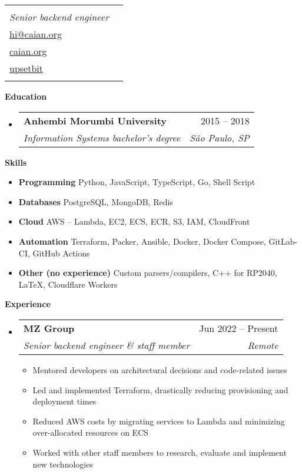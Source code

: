 \documentclass[letterpaper,12pt]{article}[leftmargin=*]
\makeatletter
\def \fullname {Caian Ertl}
\def \subtitle {Senior backend engineer}
\def \emailicon {\faEnvelope}
\def \emaillink {mailto:hi@caian.org}
\def \emailtext {hi@caian.org}
\def \phoneicon {\faPhone}
\def \phonetext {+1 (212) 555-4240}
\def \githubicon {\faGithub}
\def \githublink {https://github.com/upsetbit}
\def \githubtext {upsetbit}
\def \websiteicon {\faGlobe}
\def \websitelink {https://caian.org}
\def \websitetext {caian.org}
\def \headertype {\singlecol} %
\def \entryspacing {-0pt}
\def \phone {\phoneicon \hspace{3pt}{ \phonetext}}
\def \email {\emailicon \hspace{3pt}\href{\emaillink}{\emailtext}}
\def \github {\githubicon \hspace{3pt}\href{\githublink}{\githubtext}}
\def \website {\websiteicon \hspace{3pt}\href{\websitelink}{\websitetext}}
\renewcommand{\section}[2]{\vspace{5pt}
  \colorbox{secondary}{\color{white}\raggedbottom\normalsize\textbf{{#1}{\hspace{7pt}#2}}}
}
\newcommand{\resumeEntryStart}{\begin{itemize}[leftmargin=2.5mm]}
\newcommand{\resumeEntryEnd}{\end{itemize}\vspace{\entryspacing}}
\newcommand{\resumeItemListStart}{\begin{itemize}[leftmargin=4.5mm]}
\newcommand{\resumeItemListEnd}{\end{itemize}}
\newcommand{\resumeItem}[1]{
  \item\small{
    {#1 \vspace{-2pt}}
  }
}
\newcommand{\resumeEntryTSDL}[4]{
  \vspace{-1pt}\item[]
    \begin{tabularx}{0.97\textwidth}{X@{\hspace{60pt}}r}
      \textbf{\color{primary}#1} & {\firabook\color{accent}\small#2} \\
      \textit{\color{accent}\small#3} & \textit{\color{accent}\small#4} \\
    \end{tabularx}\vspace{-6pt}
}
\newcommand{\resumeEntryS}[2]{
  \item[]\small{
    \textbf{\color{primary}#1 }{ #2 \vspace{-6pt}}
  }
}
\newcommand{\doublecol}[5]{
  \begin{tabularx}{\textwidth}{Xr}
    {
      \begin{tabular}[c]{l}
        \fontsize{35}{45}\selectfont{\color{primary}{{\textbf{\fullname}}}} \\
        {\textit{\subtitle}} %
      \end{tabular}
    } & {
      \begin{tabular}[c]{l@{\hspace{1.5em}}l}
        {\small#3} & {\small#1} \\
        {\small#4} & {\small#2} \\
        {\small#5}
      \end{tabular}
    }
  \end{tabularx}
}
\newcommand{\singlecol}[5]{
  \begin{tabularx}{\textwidth}{Xr}
    {
      \begin{tabular}[b]{l}
        \fontsize{35}{45}\selectfont{\color{primary}{{\textbf{\fullname}}}} \\
        {\textit{\subtitle}} %
      \end{tabular}
    } & {
      \begin{tabular}[c]{l}
        {\small#1} \\
        {\small#2} \\
        {\small#3} \\
        {\small#4} \\
        {\small#5}
      \end{tabular}
    }
  \end{tabularx}
}
\makeatother
\begin{document}


\headertype{\phone}{\email}{\website}{\github}{} %
\vspace{-10pt} %

\section{\faGraduationCap}{Education}

  \resumeEntryStart
    \resumeEntryTSDL
      {Anhembi Morumbi University}{2015 -- 2018}
      {Information Systems bachelor’s degree}{São Paulo, SP}
  \resumeEntryEnd

\section{\faGears}{Skills}
 \resumeEntryStart
  \resumeEntryS{Programming } {Python, JavaScript, TypeScript, Go, Shell Script}
  \resumeEntryS{Databases } {PostgreSQL, MongoDB, Redis}
  \resumeEntryS{Cloud } {AWS -- Lambda, EC2, ECS, ECR, S3, IAM, CloudFront}
  \resumeEntryS{Automation } {Terraform, Packer, Ansible, Docker, Docker Compose, GitLab-CI, GitHub Actions}
  \resumeEntryS{Other (no experience) } {Custom parsers/compilers, C++ for RP2040, \LaTeX, Cloudflare Workers}
 \resumeEntryEnd

\section{\faPieChart}{Experience}

  \resumeEntryStart
    \resumeEntryTSDL
      {MZ Group}{Jun 2022 -- Present}
      {Senior backend engineer \& staff member}{Remote}
    \resumeItemListStart
      \resumeItem {Mentored developers on architectural decisions and code-related issues}
      \resumeItem {Led and implemented Terraform, drastically reducing provisioning and deployment times}
      \resumeItem {Reduced AWS costs by migrating services to Lambda and minimizing over-allocated resources on ECS}
      \resumeItem {Worked with other staff members to research, evaluate and implement new technologies}
    \resumeItemListEnd
  \resumeEntryEnd
\end{document}
